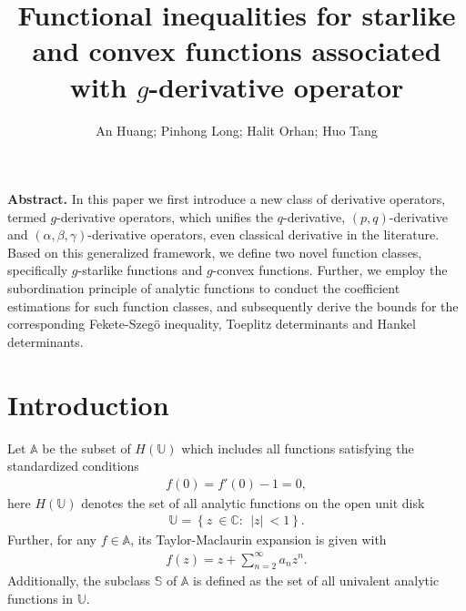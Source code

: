 \documentclass[11pt,twoside, reqno]{article}
\theoremstyle{definition}
\begin{document}

\title{\Large\bf Functional inequalities for starlike and convex functions associated with $g$-derivative operator }
\author{An Huang; Pinhong Long; Halit Orhan; Huo Tang}
\date{ }
\maketitle


\begin{center}
\begin{minipage}{13.5cm}\small
{{\bf Abstract.} In this paper we first introduce a new class of derivative operators, termed $g$-derivative operators, which unifies the $q$-derivative, $(p,q)$-derivative and $(\alpha,\beta,\gamma)$-derivative operators, 
even classical derivative in the literature. Based on this generalized framework, we define two novel function classes, specifically $g$-starlike functions and $g$-convex functions. Further, 
we employ the subordination principle of analytic functions to conduct the coefficient estimations for such function classes, and subsequently derive the bounds for the corresponding Fekete-Szeg\"{o} inequality, 
Toeplitz determinants and Hankel determinants.}
\end{minipage}
\end{center}

\section{Introduction\label{s1}}

Let $\mathbb{A}$ be the subset of $H(\mathbb{U})$ which includes all functions satisfying the standardized conditions
\begin{align}
f(0)={f}' (0)-1=0\nonumber,
\end{align}
here $H(\mathbb{U})$ denotes the set of all analytic functions on the open unit disk
\begin{align}
\mathbb{U} = \left \{ z\ \in \mathbb{C}: \ \ \left | z \right | \ < 1 \right \}\nonumber.
\end{align}
Further, for any $f\in \mathbb{A} $, its Taylor-Maclaurin expansion is given with
\begin{align}\label{e1.1}
f(z)=z+\sum^{\infty}_{n=2}a_{n}z^{n}.
\end{align}
Additionally, the subclass $\mathbb{S}$ of $\mathbb{A}$ is defined as the set of all univalent analytic functions in $\mathbb{U}$.
\end{document}
